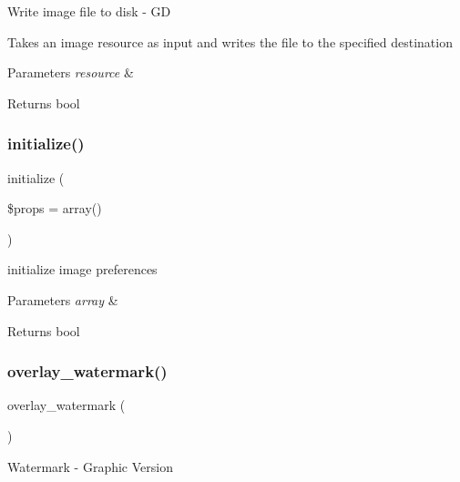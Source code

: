 Write image file to disk -\/ GD

Takes an image resource as input and writes the file to the specified destination


\begin{DoxyParams}{Parameters}
{\em resource} & \\
\hline
\end{DoxyParams}
\begin{DoxyReturn}{Returns}
bool 
\end{DoxyReturn}
\mbox{\label{class_c_i___image__lib_a0bccf32e3d2d283de0521949330cb969}} 
\subsubsection{\texorpdfstring{initialize()}{initialize()}}
{\footnotesize\ttfamily initialize (\begin{DoxyParamCaption}\item[{}]{\$props = {\ttfamily array()} }\end{DoxyParamCaption})}

initialize image preferences


\begin{DoxyParams}{Parameters}
{\em array} & \\
\hline
\end{DoxyParams}
\begin{DoxyReturn}{Returns}
bool 
\end{DoxyReturn}
\mbox{\label{class_c_i___image__lib_a7fa0fd0aabe26803d61d7e09c1cb73de}} 
\subsubsection{\texorpdfstring{overlay\+\_\+watermark()}{overlay\_watermark()}}
{\footnotesize\ttfamily overlay\+\_\+watermark (\begin{DoxyParamCaption}{ }\end{DoxyParamCaption})}

Watermark -\/ Graphic Version

